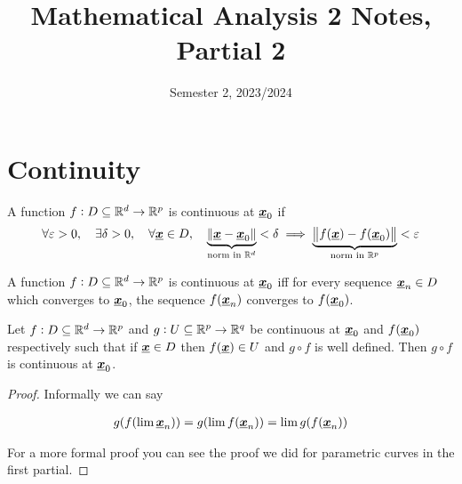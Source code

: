 \documentclass[12pt]{extarticle}
\title{Mathematical Analysis 2 Notes, Partial 2}
\date{Semester 2, 2023/2024}
\renewcommand{\vec}[1]{\uvec{#1}}
\begin{document}
\firstpage


\section{Continuity}

\begin{definition}[continuity]
    A function $f: D \subseteq \mathbb{R}^d \to \mathbb{R}^p$ is continuous at $\vec{x}_0$ if
    \begin{equation}
        \forall \varepsilon > 0,
        \quad
        \exists \delta > 0,
        \quad
        \forall \vec{x} \in D,
        \quad
        \underbrace{\norm{\vec{x} - \vec{x}_0}}_{\text{norm in } \R^d} < \delta
        \implies
        \underbrace{\norm{f(\vec{x}) - f(\vec{x}_0)}}_{\text{norm in } \R^p} < \varepsilon
    \end{equation}
\end{definition}

\begin{proposition}
    A function $f: D \subseteq \mathbb{R}^d \to \mathbb{R}^p$ is continuous at $\vec{x}_0$ iff for every sequence $\vec{x}_n \in D$ which converges to $\vec{x}_0$, the sequence $f(\vec{x}_n)$ converges to $f(\vec{x}_0)$.
\end{proposition}

\begin{proposition}
    Let $f: D \subseteq \mathbb{R}^d \to \mathbb{R}^p$ and $g: U \subseteq \mathbb{R}^p \to \mathbb{R}^q$ be continuous at $\vec{x}_0$ and $f(\vec{x}_0)$ respectively such that if $\vec{x} \in D$ then $f(\vec{x}) \in U$ and $g \circ f$ is well defined.
    Then $g \circ f$ is continuous at $\vec{x}_0$.
\end{proposition}

\begin{proof}
    Informally we can say

    \begin{align}
        g(f(\lim \vec{x}_n)) = g(\lim f(\vec{x}_n)) = \lim g(f(\vec{x}_n))
    \end{align}

    For a more formal proof you can see the proof we did for parametric curves in the first partial.
\end{proof}
\end{document}
